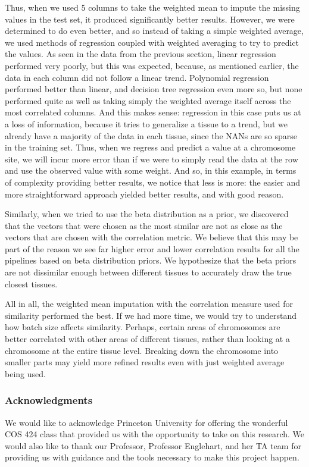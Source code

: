 \documentclass{article} %
\begin{document}
Thus, when we used 5 columns to take the weighted mean to impute the missing values in the test set, it produced significantly better results. However, we were determined to do even better, and so instead of taking a simple weighted average, we used methods of regression coupled with weighted averaging to try to predict the values. As seen in the data from the previous section, linear regression performed very poorly, but this was expected, because, as mentioned earlier, the data in each column did not follow a linear trend. Polynomial regression performed better than linear, and decision tree regression even more so, but none performed quite as well as taking simply the weighted average itself across the most correlated columns. And this makes sense: regression in this case puts us at a loss of information, because it tries to generalize a tissue to a trend, but we already have a majority of the data in each tissue, since the NANs are so sparse in the training set. Thus, when we regress and predict a value at a chromosome site, we will incur more error than if we were to simply read the data at the row and use the observed value with some weight. And so, in this example, in terms of complexity providing better results, we notice that less is more: the easier and more straightforward approach yielded better results, and with good reason.

Similarly, when we tried to use the beta distribution as a prior, we discovered that the vectors that were chosen as the most similar are not as close as the vectors that are chosen with the correlation metric. We believe that this may be part of the reason we see far higher error and lower correlation results for all the pipelines based on beta distribution priors. We hypothesize that the beta priors are not dissimilar enough between different tissues to accurately draw the true closest tissues.

All in all, the weighted mean imputation with the correlation measure used for similarity performed the best. If we had more time, we would try to understand how batch size affects similarity. Perhaps, certain areas of chromosomes are better correlated with other areas of different tissues, rather than looking at a chromosome at the entire tissue level. Breaking down the chromosome into smaller parts may yield more refined results even with just weighted average being used.

\subsubsection*{Acknowledgments}
We would like to acknowledge Princeton University for offering the wonderful COS 424 class that provided us with the opportunity to take on this research. We would also like to thank our Professor, Professor Englehart, and her TA team for providing us with guidance and the tools necessary to make this project happen.
\end{document}
